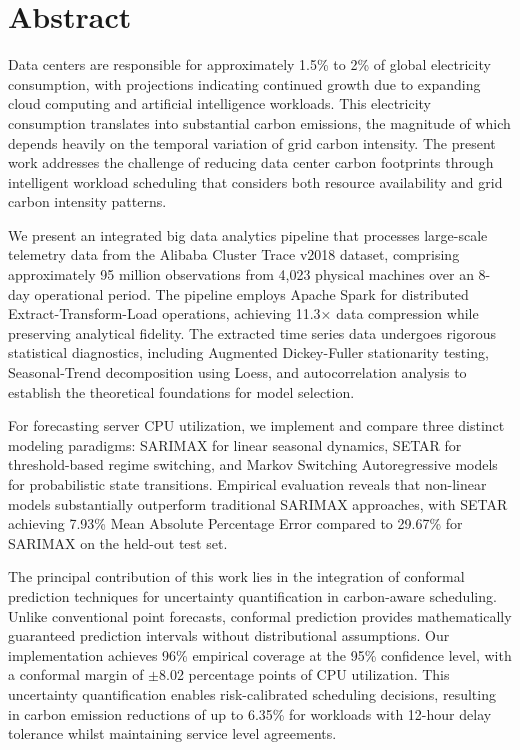 \documentclass[12pt]{report}
\begin{document}

\chapter*{Abstract\hfill} 

Data centers are responsible for approximately 1.5\% to 2\% of global electricity consumption, with projections indicating continued growth due to expanding cloud computing and artificial intelligence workloads. This electricity consumption translates into substantial carbon emissions, the magnitude of which depends heavily on the temporal variation of grid carbon intensity. The present work addresses the challenge of reducing data center carbon footprints through intelligent workload scheduling that considers both resource availability and grid carbon intensity patterns.

We present an integrated big data analytics pipeline that processes large-scale telemetry data from the Alibaba Cluster Trace v2018 dataset, comprising approximately 95 million observations from 4,023 physical machines over an 8-day operational period. The pipeline employs Apache Spark for distributed Extract-Transform-Load operations, achieving 11.3× data compression while preserving analytical fidelity. The extracted time series data undergoes rigorous statistical diagnostics, including Augmented Dickey-Fuller stationarity testing, Seasonal-Trend decomposition using Loess, and autocorrelation analysis to establish the theoretical foundations for model selection.

For forecasting server CPU utilization, we implement and compare three distinct modeling paradigms: SARIMAX for linear seasonal dynamics, SETAR for threshold-based regime switching, and Markov Switching Autoregressive models for probabilistic state transitions. Empirical evaluation reveals that non-linear models substantially outperform traditional SARIMAX approaches, with SETAR achieving 7.93\% Mean Absolute Percentage Error compared to 29.67\% for SARIMAX on the held-out test set.

The principal contribution of this work lies in the integration of conformal prediction techniques for uncertainty quantification in carbon-aware scheduling. Unlike conventional point forecasts, conformal prediction provides mathematically guaranteed prediction intervals without distributional assumptions. Our implementation achieves 96\% empirical coverage at the 95\% confidence level, with a conformal margin of $\pm$8.02 percentage points of CPU utilization. This uncertainty quantification enables risk-calibrated scheduling decisions, resulting in carbon emission reductions of up to 6.35\% for workloads with 12-hour delay tolerance whilst maintaining service level agreements.
\end{document}
